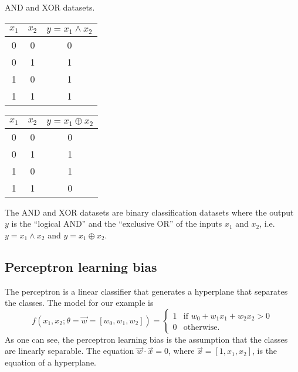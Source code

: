 \begin{tablebox}[label=tab:and-xor]{AND and XOR datasets.}
  \centering
  \begin{minipage}{0.45\textwidth}
    \centering
    \begin{tabular}{ccc}
      \toprule
      $x_1$ & $x_2$ & $y = x_1 \land x_2$ \\
      \midrule
      0 & 0 & 0 \\
      0 & 1 & 1 \\
      1 & 0 & 1 \\
      1 & 1 & 1 \\
      \bottomrule
    \end{tabular}
  \end{minipage}
  \begin{minipage}{0.45\textwidth}
  \centering
  \begin{tabular}{ccc}
    \toprule
    $x_1$ & $x_2$ & $y = x_1 \oplus x_2$ \\
    \midrule
    0 & 0 & 0 \\
    0 & 1 & 1 \\
    1 & 0 & 1 \\
    1 & 1 & 0 \\
    \bottomrule
  \end{tabular}
  \end{minipage}
  \tcblower
  The AND and XOR datasets are binary classification datasets where the output $y$ is the
  ``logical AND'' and the ``exclusive OR'' of the inputs $x_1$ and $x_2$, i.e.
  $y = x_1 \land x_2$ and $y = x_1 \oplus x_2$.
\end{tablebox}

\subsection{Perceptron learning bias}

The perceptron is a linear classifier that generates a hyperplane that separates the
classes.  The model for our example is
\begin{equation*}
  f(x_1, x_2; \theta = \vec{w} = \left[w_0, w_1, w_2\right]) =  \begin{cases}
    1 & \text{if } w_0 + w_1 x_1 + w_2 x_2 > 0 \\
    0 & \text{otherwise.}
  \end{cases}
\end{equation*}
As one can see, the perceptron learning bias is the assumption that the classes are
linearly separable. The equation $\vec{w} \cdot \vec{x} = 0$, where $\vec{x} = [1, x_1,
x_2]$, is the equation of a hyperplane.

